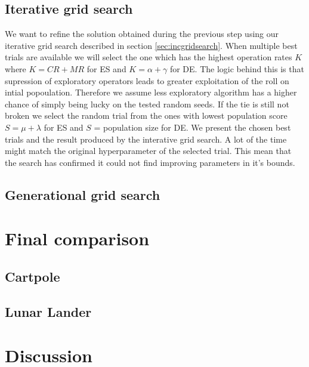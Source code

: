 \subsection{Iterative grid search}
We want to refine the solution obtained during the previous step using our iterative grid search described in section \ref{sec:incgridsearch}. When multiple best trials are available we will select the one which has the highest operation rates $ K $ where $ K = CR + MR $ for ES and $ K = \alpha + \gamma$ for DE. The logic behind this is that supression of exploratory operators leads to greater exploitation of the roll on intial popoulation. Therefore we assume less exploratory algorithm has a higher chance of simply being lucky on the tested random seeds.  If the tie is still not broken we select the random trial from the ones with lowest population score $ S = \mu +\lambda $ for ES and  $ S $ = population size  for DE.
We present the chosen best trials and the result produced by the interative grid search. A lot of the time might match the original hyperparameter of the selected trial. This mean that the search has confirmed it could not find improving parameters in it's bounds.

\subsection{Generational grid search}
\section{Final comparison}
\subsection{Cartpole}
\subsection{Lunar Lander}
\section{Discussion}
